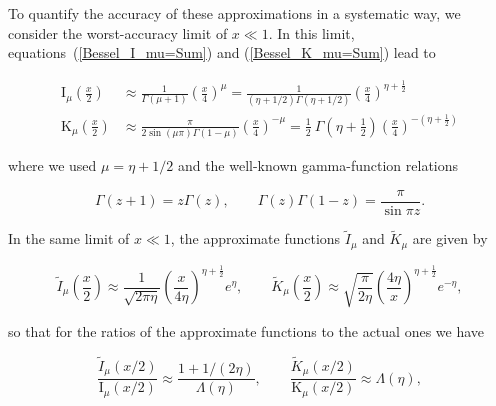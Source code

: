 \documentclass[draft]{agujournal2019}
\begin{document}
{To quantify the accuracy of these approximations in a systematic way, 
we consider the worst-accuracy limit of $x\ll1$. In this limit, equations~(\ref{Bessel_I_mu=Sum}) and
(\ref{Bessel_K_mu=Sum}) lead to
\begin{linenomath*}
\begin{subequations}
\label{Bessel_I,K,x<<1}
\begin{align}
\mathrm{I}_{\mu}\left(  \frac{x}{2}\right)   &  \approx\frac{1}{\Gamma(\mu
+1)}\left(  \frac{x}{4}\right)  ^{\mu}=\frac{1}{(\eta+1/2)  \Gamma(\eta+1/2)}\left(  \frac{x}{4}\right)  ^{\eta
+\frac{1}{2}}\label{Bessel_I,x<<1}\\
\mathrm{K}_{\mu}\left(\frac{x}{2}\right)  &  \approx\frac{\pi}{2\sin\left(  \mu
\pi\right)  \Gamma(1-\mu)}\left(  \frac{x}{4}\right)  ^{-\mu}=\frac{1}%
{2}\ \Gamma\left(  \eta+\frac{1}{2}\right)  \left(  \frac{x}{4}\right)
^{-\left(  \eta+\frac{1}{2}\right)  } \label{Bessel_K,x<<1}%
\end{align}
\end{subequations}
\end{linenomath*}
where we used $\mu=\eta+1/2$ and the well-known gamma-function relations
\begin{linenomath*}
\begin{equation}
\Gamma(z+1)=z\Gamma(z),\qquad\Gamma(z)\Gamma(1-z)=\frac{\pi}{\sin\pi z}.
\label{Gamma_sootno}
\end{equation}
\end{linenomath*}
In the same limit of $x\ll1$, the approximate functions $\tilde{I}_{\mu}$ and
$\tilde{K}_{\mu}$ are given by
\begin{linenomath*}
\begin{equation}
\tilde{I}_{\mu}\left(  \frac{x}{2}\right)  \approx\frac{1}{\sqrt{2\pi\eta}%
}\left(  \frac{x}{4\eta}\right)  ^{\eta+\frac{1}{2}}e^{\eta},\qquad\tilde
{K}_{\mu}\left(  \frac{x}{2}\right)  \approx\sqrt{\frac{\pi}{2\eta}}\left(
\frac{4\eta}{x}\right)  ^{\eta+\frac{1}{2}}e^{-\eta}, 
\label{I,K_approx_x<<1}
\end{equation}
\end{linenomath*}
so that for the ratios of the approximate functions to the actual ones we have
\begin{linenomath*}
\begin{equation}
\frac{\tilde{I}_{\mu}(x/2)  }{\mathrm{I}_{\mu}(x/2)}\approx\frac{1+1/(2\eta)}{\Lambda\left(
\eta\right)  },\qquad\frac{\tilde{K}_{\mu}(x/2)
}{\mathrm{K}_{\mu}(x/2)  }\approx\Lambda\left(
\eta\right)  , 
\label{prome}
\end{equation}

\end{linenomath*}}
\end{document}
